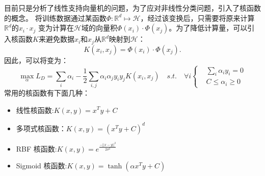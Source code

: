 目前只是分析了线性支持向量机的问题，为了应对非线性分类问题，引入了核函数的概念。
将训练数据通过某函数$\Phi:\mathbb{R}^d\mapsto\mathcal{H}$，经过该变换后，只需要将原来计算$\mathbb{R}^d$的$x_i\cdot x_j$ 变为计算在$\mathcal{H}$域的向量积$\Phi(x_i)\cdot\Phi(x_j)$。为了降低计算量，可以引入核函数$K$来避免数据$x_i$和$x_j$从$\mathbb{R}^d$映射到$\mathcal{H}$：
\begin{equation}
	K(x_i,x_j)=\Phi(x_i)\cdot\Phi(x_j).
\end{equation}
因此，可以将变为：
\begin{equation}
	\max \limits_{\alpha} L_D=\sum_i{\alpha_i}-\frac{1}{2}\sum_{i,j}\alpha_i\alpha_jy_iy_j K(x_i,x_j)\quad s.t. \quad \forall i
	\left\{
		\begin{aligned}
	   &\sum_i{\alpha_iy_i}=0  \\
	   &C \leq \alpha_i \geq 0
	   \end{aligned}
		\right.
\end{equation}
常用的核函数有下面几种：
\begin{itemize}
	\item 线性核函数:$K(x,y)=x^Ty+C$
	\item 多项式核函数：$K(x,y)=(x^Ty+C)^d$
	\item RBF 核函数:$K(x,y)=e^{\frac{-||x-y||^2}{2\sigma^2}}$
	\item Sigmoid 核函数:$K(x,y)=\tanh(\alpha x^Ty+C)$
\end{itemize}



